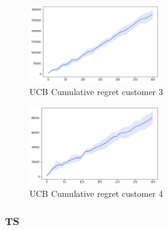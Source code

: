 \begin{multicols}{2}
    \begin{figure}[H]
        \begin{center}
        \includegraphics[width=0.5\textwidth]{img/ucb7_3cum_reg.png}
        \caption{UCB Cumulative regret customer 3}
        \label{fig:cum_reg73}
        \end{center}
    \end{figure}
    \columnbreak
    \begin{figure}[H]
        \begin{center}
        \includegraphics[width=0.5\textwidth]{img/ucb7_4cum_reg.png}
        \caption{UCB Cumulative regret customer 4}
        \label{fig:cum_reg74}
        \end{center}
    \end{figure}
\end{multicols}




\subsubsection{TS}
